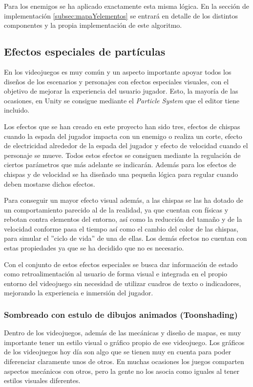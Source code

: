 Para los enemigos se ha aplicado exactamente esta misma lógica. En la sección de implementación \ref{subsec:mapaYelementos} se entrará en detalle de los distintos componentes y la propia implementación de este algoritmo.

\subsection{Efectos especiales de partículas}

En los videojuegos es muy común y un aspecto importante apoyar todos los diseños de los escenarios y personajes con efectos especiales visuales, con el objetivo de mejorar la experiencia del usuario jugador. Esto, la mayoría de las ocasiones, en Unity se consigue mediante el \textit{Particle System} \cite{ParticleSystem} que el editor tiene incluido.

Los efectos que se han creado en este proyecto han sido tres, efectos de chispas cuando la espada del jugador impacta con un enemigo o realiza un corte, efecto de electricidad alrededor de la espada del jugador y efecto de velocidad cuando el personaje se mueve. Todos estos efectos se consiguen mediante la regulación de ciertos parámetros que más adelante se indicarán. Además para los efectos de chispas y de velocidad se ha diseñado una pequeña lógica para regular cuando deben mostarse dichos efectos.

Para conseguir un mayor efecto visual además, a las chispas se las ha dotado de un comportamiento parecido al de la realidad, ya que cuentan con físicas y rebotan contra elementos del entorno, así como la reducción del tamaño y de la velocidad conforme pasa el tiempo así como el cambio del color de las chispas, para simular el ''ciclo de vida'' de una de ellas. Los demás efectos no cuentan con estas propiedades ya que se ha decidido que no es necesario.

Con el conjunto de estos efectos especiales se busca dar información de estado como retroalimentación al usuario de forma visual e integrada en el propio entorno del videojuego sin necesidad de utilizar cuadros de texto o indicadores, mejorando la experiencia e inmersión del jugador.

\subsubsection{Sombreado con estulo de dibujos animados (Toonshading)}

Dentro de los videojuegos, además de las mecánicas y diseño de mapas, es muy importante tener un estilo visual o gráfico propio de ese videojuego. Los gráficos de los videojuegos hoy día son algo que se tienen muy en cuenta para poder diferenciar claramente unos de otros. En muchas ocasiones los juegos comparten aspectos mecánicos con otros, pero la gente no los asocia como iguales al tener estilos visuales diferentes. 

